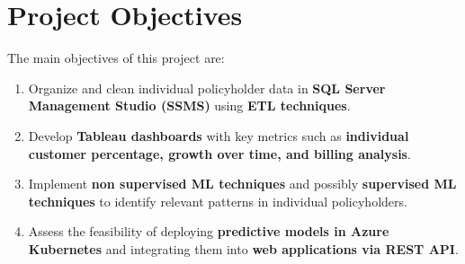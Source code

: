 \section{Project Objectives}

The main objectives of this project are:

\begin{enumerate}
    \item Organize and clean individual policyholder data 
          in \textbf{SQL Server Management Studio (SSMS)} 
          using \textbf{ETL techniques}.
    \item Develop \textbf{Tableau dashboards} with key metrics 
          such as \textbf{individual customer percentage, 
          growth over time, and billing analysis}.
    \item Implement \textbf{non supervised ML techniques} and possibly
          \textbf{supervised ML techniques} to identify relevant 
          patterns in individual policyholders.
    \item Assess the feasibility of deploying \textbf{predictive 
          models in Azure Kubernetes} and integrating them 
          into \textbf{web applications via REST API}.
\end{enumerate}